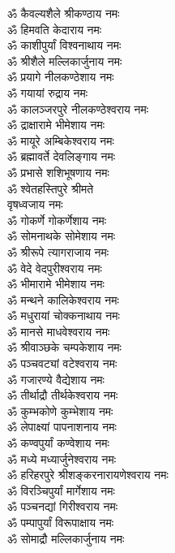\begin{multicols}{2}
\begin{flushleft}
ॐ कैवल्यशैले श्रीकण्ठाय नमः\\
ॐ हिमवति केदाराय नमः\\
ॐ काशीपुर्यां विश्वनाथाय नमः\\
ॐ श्रीशैले मल्लिकार्जुनाय नमः\\
ॐ प्रयागे नीलकण्ठेशाय नमः\\
ॐ गयायां रुद्राय नमः\\
ॐ कालञ्जरपुरे नीलकण्ठेश्वराय नमः\\
ॐ द्राक्षारामे भीमेशाय नमः\\
ॐ मायूरे अम्बिकेश्वराय नमः\\
ॐ ब्रह्मावर्ते देवलिङ्गाय नमः\hfill{}\\
ॐ प्रभासे शशिभूषणाय नमः\\
ॐ श्वेतहस्तिपुरे श्रीमते\\ वृषध्वजाय नमः\\
ॐ गोकर्णे गोकर्णेशाय नमः\\
ॐ सोमनाथके सोमेशाय नमः\\
ॐ श्रीरूपे त्यागराजाय नमः\\
ॐ वेदे वेदपुरीश्वराय नमः\\
ॐ भीमारामे भीमेशाय नमः\\
ॐ मन्थने कालिकेश्वराय नमः\\
ॐ मधुरायां चोक्कनाथाय नमः\\
ॐ मानसे माधवेश्वराय नमः\hfill{}\\
ॐ श्रीवाञ्छके चम्पकेशाय नमः\\
ॐ पञ्चवट्यां वटेश्वराय नमः\\
ॐ गजारण्ये वैद्येशाय नमः\\
ॐ तीर्थाद्रौ तीर्थकेश्वराय नमः\\
ॐ कुम्भकोणे कुम्भेशाय नमः\\
ॐ लेपाक्ष्यां पापनाशनाय नमः\\
ॐ कण्वपुर्यां कण्वेशाय नमः\\
ॐ मध्ये मध्यार्जुनेश्वराय नमः\\
ॐ हरिहरपुरे श्रीशङ्करनारायणेश्वराय नमः\\
ॐ विरञ्चिपुर्यां मार्गेशाय नमः\hfill{}\\
ॐ पञ्चनद्यां गिरीश्वराय नमः\\
ॐ पम्पापुर्यां विरूपाक्षाय नमः\\
ॐ सोमाद्रौ मल्लिकार्जुनाय नमः\\

\end{flushleft}
\end{multicols}
